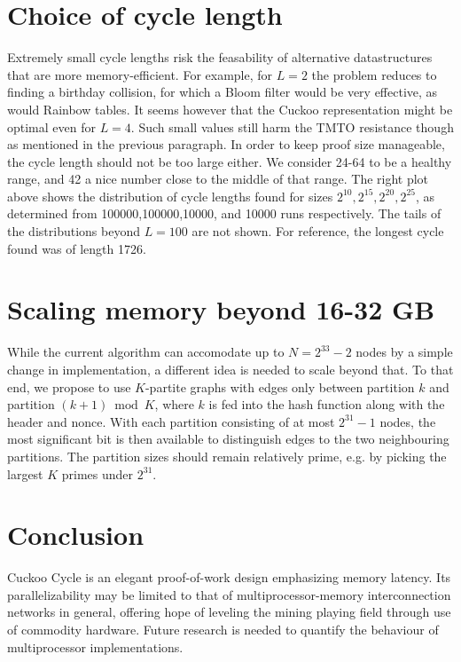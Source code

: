 \documentclass[11pt, oneside]{article}
\begin{document}
\section{Choice of cycle length}
Extremely small cycle lengths risk the feasability of alternative datastructures that
are more memory-efficient. For example, for $L=2$ the problem reduces to finding a birthday collision,
for which a Bloom filter would be very effective, as would Rainbow tables.
It seems however that the Cuckoo representation might be optimal even for $L=4$.
Such small values still harm the TMTO resistance though as mentioned in the previous paragraph.
In order to keep proof size manageable, the cycle length should not be too large either.
We consider 24-64 to be a healthy range, and 42 a nice number close to the middle of that range.
The right plot above shows the distribution of cycle lengths found for sizes $2^{10},2^{15},2^{20},2^{25}$,
as determined from 100000,100000,10000, and 10000 runs respectively. The tails of the distributions
beyond $L=100$ are not shown. For reference, the longest cycle found was of length 1726.

\section{Scaling memory beyond 16-32 GB}
While the current algorithm can accomodate up to $N=2^{33}-2$ nodes by a simple change
in implementation, a different idea is needed to scale beyond that.
To that end, we propose to use $K$-partite graphs with edges only between partition $k$ and partition $(k+1) \bmod K$,
where $k$ is fed into the hash function along with the header and nonce. With each partition consisting of at most
$2^31-1$ nodes, the most significant bit is then available to distinguish edges to the two neighbouring partitions.
The partition sizes should remain relatively prime, e.g. by picking the largest $K$ primes under $2^{31}$.

\section{Conclusion}
Cuckoo Cycle is an elegant proof-of-work design emphasizing memory latency.
Its parallelizability may be limited to that of multiprocessor-memory interconnection networks
in general, offering hope of leveling the mining playing field through use of commodity hardware.
Future research is needed to quantify the behaviour of multiprocessor implementations.



\end{document}
